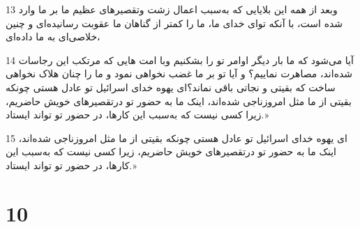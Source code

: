 \par 13 وبعد از همه این بلایایی که به‌سبب اعمال زشت وتقصیرهای عظیم ما بر ما وارد شده است، با آنکه تو‌ای خدای ما، ما را کمتر از گناهان ما عقوبت رسانیده‌ای و چنین خلاصی‌ای به ما داده‌ای،
\par 14 آیا می‌شود که ما بار دیگر اوامر تو را بشکنیم وبا امت هایی که مرتکب این رجاسات شده‌اند، مصاهرت نماییم؟ و آیا تو بر ما غضب نخواهی نمود و ما را چنان هلاک نخواهی ساخت که بقیتی و نجاتی باقی نماند؟‌ای یهوه خدای اسرائیل تو عادل هستی چونکه بقیتی از ما مثل امروزناجی شده‌اند، اینک ما به حضور تو درتقصیرهای خویش حاضریم، زیرا کسی نیست که به‌سبب این کارها، در حضور تو تواند ایستاد.»
\par 15 ‌ای یهوه خدای اسرائیل تو عادل هستی چونکه بقیتی از ما مثل امروزناجی شده‌اند، اینک ما به حضور تو درتقصیرهای خویش حاضریم، زیرا کسی نیست که به‌سبب این کارها، در حضور تو تواند ایستاد.»
 
\chapter{10}

